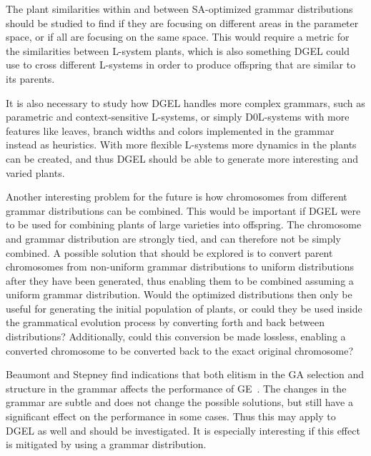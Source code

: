 The plant similarities within and between \gls{SA}-optimized grammar distributions should be studied to find if they are focusing on different areas in the parameter space, or if all are focusing on the same space.
This would require a metric for the similarities between \gls{L-system} plants, which is also something \gls{DGEL} could use to cross different \glspl{L-system} in order to produce offspring that are similar to its parents.

It is also necessary to study how \gls{DGEL} handles more complex grammars, such as parametric and context-sensitive \glspl{L-system}, or simply D0L-systems with more features like leaves, branch widths and colors implemented in the grammar instead as heuristics.
With more flexible \glspl{L-system} more dynamics in the plants can be created, and thus \gls{DGEL} should be able to generate more interesting and varied plants.

Another interesting problem for the future is how chromosomes from different grammar distributions can be combined.
This would be important if \gls{DGEL} were to be used for combining plants of large varieties into offspring.
The chromosome and grammar distribution are strongly tied, and can therefore not be simply combined.
A possible solution that should be explored is to convert parent chromosomes from non-uniform grammar distributions to uniform distributions after they have been generated, thus enabling them to be combined assuming a uniform grammar distribution.
Would the optimized distributions then only be useful for generating the initial population of plants, or could they be used inside the grammatical evolution process by converting forth and back between distributions?
Additionally, could this conversion be made lossless, enabling a converted chromosome to be converted back to the exact original chromosome?

Beaumont and Stepney find indications that both elitism in the \gls{GA} selection and structure in the grammar affects the performance of \gls{GE}~\cite{2009Beaumont}.
The changes in the grammar are subtle and does not change the possible solutions, but still have a significant effect on the performance in some cases.
Thus this may apply to \gls{DGEL} as well and should be investigated.
It is especially interesting if this effect is mitigated by using a grammar distribution.
